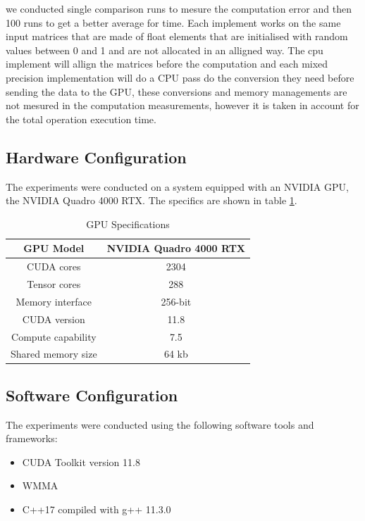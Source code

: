 \documentclass[conference]{IEEEtran}
\begin{document}
  we conducted single comparison runs to mesure the computation error and then 100 runs to get a better average for time.
  Each implement works on the same input matrices that are made of float elements that are initialised with random values between 0 and 1
  and are not allocated in an alligned way. The cpu implement will allign the matrices before the computation and each mixed precision implementation will do a CPU pass do the conversion they need
  before sending the data to the GPU, these conversions and memory managements are not mesured in the computation 
  measurements, however it is taken in account for the total operation execution time.

  \subsection{Hardware Configuration}\label{sec:hardware-configuration}
  
  The experiments were conducted on a system equipped with an NVIDIA GPU, the NVIDIA Quadro 4000 RTX.
  The specifics are shown in table \ref{GPU}.
  
  \begin{table}[htbp]
  \caption{GPU Specifications\cite{Voltatuningguide}}
  \centering
  \label{GPU}
    \begin{tabular}{|c|c|}
    \hline
    GPU Model & NVIDIA Quadro 4000 RTX \\
    \hline
    CUDA cores & 2304 \\
    \hline
    Tensor cores & 288 \\
    \hline
    Memory interface & 256-bit \\
    \hline
    CUDA version & 11.8 \\
    \hline
    Compute capability & 7.5 \\
    \hline
    Shared memory size & 64 kb \\
    \hline
    
  \end{tabular}
  \end{table}
  
  \subsection{Software Configuration}\label{sec:software-configuration}
  
  The experiments were conducted using the following software tools and frameworks:
  
  \begin{itemize}
    \item CUDA Toolkit version 11.8
    \item WMMA
    \item C++17 compiled with g++ 11.3.0
  \end{itemize}
\end{document}

